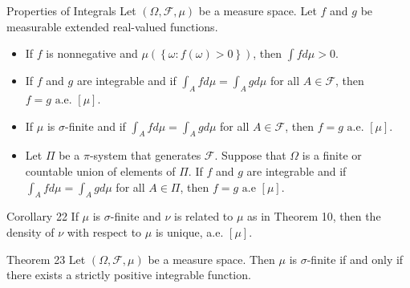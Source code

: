 \documentclass[avery5371,grid]{flashcards}
\begin{document}
\begin{flashcard}[Theorem]{Properties of Integrals}
\scriptsize
  Let $\left( \Omega,\mathcal{F},\mu \right)$ be a measure space. Let $f$ and
  $g$ be measurable extended real-valued functions.
  \begin{itemize}
   \item If $f$ is nonnegative and $\mu\left( \left\{ \omega : f\left( \omega \right) > 0 \right\} \right)$,
   then $\int f d\mu > 0$.
   \item If $f$ and $g$ are integrable and if $\int_A f d\mu = \int_A g d\mu$ 
   for all $A \in \mathcal{F}$, then $f = g \text{ a.e. }[\mu]$.
   \item If $\mu$ is $\sigma$-finite and if $\int_A f d\mu = \int_A g d\mu$ for all
   $A \in \mathcal{F}$, then $f = g \text{ a.e. }[\mu]$.
   \item Let $\Pi$ be a $\pi$-system that generates $\mathcal{F}$. Suppose that $\Omega$ is a finite or 
   countable union of elements of $\Pi$. If $f$ and $g$ are integrable and if
   $\int_A f d\mu = \int_A g d\mu$ for all $A \in \Pi$, then $f = g \text{ a.e } [\mu]$.
  \end{itemize}
\end{flashcard}

\begin{flashcard}[Corollary]{Corollary 22}
  If $\mu$ is $\sigma$-finite and $\nu$ is related to $\mu$ as in Theorem 10, then the density
  of $\nu $ with respect to $\mu$ is unique, a.e. $[\mu]$.
\end{flashcard}

\begin{flashcard}[Theorem]{Theorem 23}
  Let $\left( \Omega,\mathcal{F},\mu \right)$ be a measure space. Then $\mu$ is $\sigma$-finite if and only if
  there exists a strictly positive integrable function.
\end{flashcard}
\end{document}
